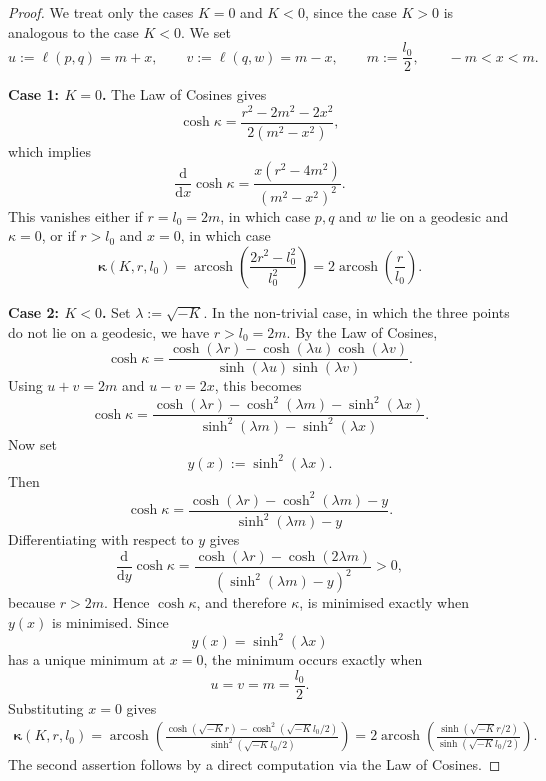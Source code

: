\documentclass[hidelinks,12pt,a4paper]{article}
\numberwithin{equation}{section}
\theoremstyle{plain}
\theoremstyle{definition}
\DeclareMathOperator{\arcosh}{arcosh}
\begin{document}
\begin{proof}
We treat only the cases $K=0$ and $K<0$, since the case $K>0$ is analogous to the case $K<0$. We set
\[
u:=\ell(p,q)=m+x,\qquad v:=\ell(q,w)=m-x,\qquad m:=\frac{l_0}{2},\qquad -m<x<m.
\]

\medskip
\noindent
\textbf{Case 1: $K=0$.}
The Law of Cosines gives
\[
\cosh \kappa
=
\frac{r^2-2m^2-2x^2}{2(m^2-x^2)},
\]
which implies
\[
\frac{\mathrm{d}}{\mathrm{d}x}\cosh \kappa
=\frac{x(r^2-4m^2)}{(m^2-x^2)^2}.
\]
This vanishes either if $r=l_0=2m$, in which case $p,q$ and $w$ lie on a geodesic and $\kappa=0$, or if $r > l_0$ and $x=0$, in which case 
\[
\bm{\kappa}(K,r,l_0)=\arcosh\!\left(\frac{2r^2-l_0^2}{l_0^2}\right)=2\arcosh\!\left(\frac{r}{l_0}\right).
\]

\medskip
\noindent
\textbf{Case 2: $K<0$.}
Set $\lambda:=\sqrt{-K}$.
In the non-trivial case, in which the three points do not lie on a geodesic, we have $r>l_0=2m$.
By the Law of Cosines,
\begin{equation*}
\cosh\kappa = \frac{\cosh(\lambda r)-\cosh(\lambda u)\cosh(\lambda v)}{\sinh(\lambda u)\sinh(\lambda v)}.
\end{equation*}
Using $u+v=2m$ and $u-v=2x$, this becomes
\begin{equation*}
\cosh\kappa = \frac{\cosh(\lambda r)-\cosh^2(\lambda m)-\sinh^2(\lambda x)}{\sinh^2(\lambda m)-\sinh^2(\lambda x)}.
\end{equation*}
Now set
\begin{equation*}
y(x):=\sinh^2(\lambda x).
\end{equation*}
Then
\begin{equation*}
\cosh\kappa = \frac{\cosh(\lambda r)-\cosh^2(\lambda m)-y}{\sinh^2(\lambda m)-y}.
\end{equation*}
Differentiating with respect to $y$ gives
\begin{equation*}
\frac{\mathrm{d}}{\mathrm{d}y}\cosh\kappa = \frac{\cosh(\lambda r)-\cosh(2\lambda m)}{(\sinh^2(\lambda m)-y)^2} >0,
\end{equation*}
because $r>2m$. Hence $\cosh\kappa$, and therefore $\kappa$, is minimised exactly when $y(x)$ is minimised. Since
\begin{equation*}
y(x)=\sinh^2(\lambda x)
\end{equation*}
has a unique minimum at $x=0$, the minimum occurs exactly when
\begin{equation*}
u=v=m=\frac{l_0}{2}.
\end{equation*}
Substituting $x=0$ gives
\begin{equation*}
\begin{aligned}
\bm{\kappa}(K,r,l_0) = \arcosh{\left(\frac{\cosh(\sqrt{-K}r)-\cosh^2(\sqrt{-K}l_0/2)}{\sinh^2(\sqrt{-K}l_0/2)}\right)}= 2\arcosh{\left(\frac{\sinh(\sqrt{-K}r/2)}{\sinh(\sqrt{-K}l_0/2)}\right)}.
\end{aligned}
\end{equation*}
\noindent
The second assertion follows by a direct computation via the Law of Cosines.
\end{proof}
\end{document}
